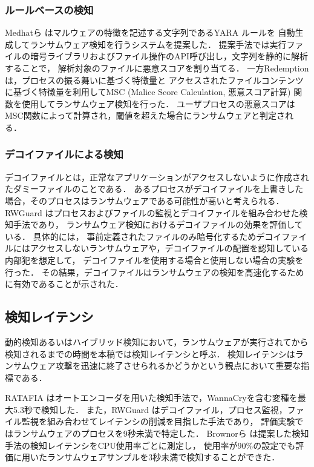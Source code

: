 \subsubsection{ルールベースの検知}
Medhatら \cite{yara-rule} はマルウェアの特徴を記述する文字列であるYARA \cite{yara-rule-doc} ルールを
自動生成してランサムウェア検知を行うシステムを提案した．
提案手法では実行ファイルの暗号ライブラリおよびファイル操作のAPI呼び出し，文字列を静的に解析することで，
解析対象のファイルに悪意スコアを割り当てる．
一方Redemption \cite{kharraz2017redemption} は，プロセスの振る舞いに基づく特徴量と
アクセスされたファイルコンテンツに基づく特徴量を利用してMSC (Malice Score Calculation, 悪意スコア計算) 関数を使用してランサムウェア検知を行った．
ユーザプロセスの悪意スコアはMSC関数によって計算され，閾値を超えた場合にランサムウェアと判定される．

\subsubsection{デコイファイルによる検知}
デコイファイルとは，正常なアプリケーションがアクセスしないように作成されたダミーファイルのことである．
あるプロセスがデコイファイルを上書きした場合，そのプロセスはランサムウェアである可能性が高いと考えられる．
RWGuard \cite{mehnaz2018rwguard} はプロセスおよびファイルの監視とデコイファイルを組み合わせた検知手法であり，
ランサムウェア検知におけるデコイファイルの効果を評価している．
具体的には，
事前定義されたファイルのみ暗号化するためデコイファイルにはアクセスしないランサムウェアや，デコイファイルの配置を認知している内部犯を想定して，
デコイファイルを使用する場合と使用しない場合の実験を行った．
その結果，デコイファイルはランサムウェアの検知を高速化するために有効であることが示された．

\subsection{検知レイテンシ}
動的検知あるいはハイブリッド検知において，ランサムウェアが実行されてから検知されるまでの時間を本稿では検知レイテンシと呼ぶ．
検知レイテンシはランサムウェア攻撃を迅速に終了させられるかどうかという観点において重要な指標である．

RATAFIA \cite{alam2019ratafia} はオートエンコーダを用いた検知手法で，WannaCryを含む変種を最大5.3秒で検知した．
また，RWGuard \cite{mehnaz2018rwguard} はデコイファイル，プロセス監視，ファイル監視を組み合わせてレイテンシの削減を目指した手法であり，
評価実験ではランサムウェアのプロセスを9秒未満で特定した．
Brownorら \cite{brownor2024ransomware} は提案した検知手法の検知レイテンシをCPU使用率ごとに測定し，
使用率が90\%の設定でも評価に用いたランサムウェアサンプルを3秒未満で検知することができた．

